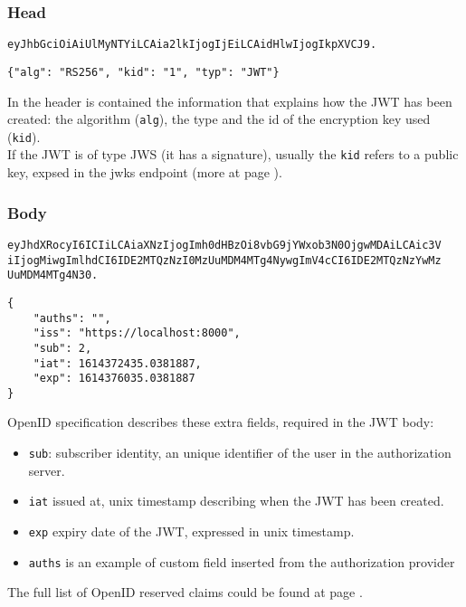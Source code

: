 \documentclass[11pt]{style}
\begin{document}
\subsubsection{Head}
\begin{lstlisting}
eyJhbGciOiAiUlMyNTYiLCAia2lkIjogIjEiLCAidHlwIjogIkpXVCJ9.
\end{lstlisting}
\begin{lstlisting}
{"alg": "RS256", "kid": "1", "typ": "JWT"}
\end{lstlisting}

In the header is contained the information that explains how the JWT has been
created: the algorithm (\texttt{alg}), the type and the id of the encryption key
used (\texttt{kid}).
\\
If the JWT is of type JWS (it has a signature), usually the \texttt{kid} refers
to a public key, expsed in the jwks endpoint (more at page \pageref{jwks}).

\subsubsection{Body}
\begin{lstlisting}
eyJhdXRocyI6ICIiLCAiaXNzIjogImh0dHBzOi8vbG9jYWxob3N0OjgwMDAiLCAic3V
iIjogMiwgImlhdCI6IDE2MTQzNzI0MzUuMDM4MTg4NywgImV4cCI6IDE2MTQzNzYwMz
UuMDM4MTg4N30.
\end{lstlisting}
\begin{lstlisting}
{
    "auths": "",
    "iss": "https://localhost:8000",
    "sub": 2,
    "iat": 1614372435.0381887,
    "exp": 1614376035.0381887
}
\end{lstlisting}

OpenID specification describes these extra fields, required in the JWT body:
\begin{itemize}
    \item \texttt{sub}: subscriber identity, an unique identifier of the user in
        the authorization server.
    \item \texttt{iat} issued at, unix timestamp describing when the JWT has
        been created.
    \item \texttt{exp} expiry date of the JWT, expressed in unix timestamp.
    \item \texttt{auths} is an example of custom field inserted from the authorization
        provider
\end{itemize}

The full list of OpenID reserved claims could be found at page \pageref{openid}.
\end{document}

